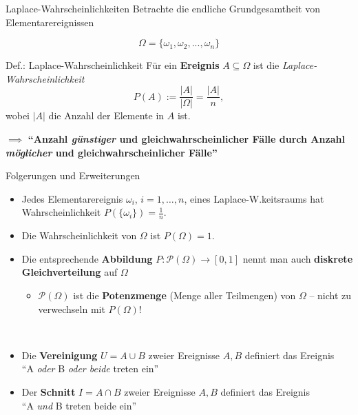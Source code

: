 \documentclass[
  10pt,
  ignorenonframetext,
]{beamer}
\providecommand{\tightlist}{%
  \setlength{\itemsep}{0pt}\setlength{\parskip}{0pt}}
\begin{document}
\begin{frame}{Laplace-Wahrscheinlichkeiten}
\label{laplace-wahrscheinlichkeiten-1}
Betrachte die endliche Grundgesamtheit von Elementarereignissen

\[\Omega = \{\omega_1, \omega_2, ..., \omega_n \}\]

\begin{block}{Def.: Laplace-Wahrscheinlichkeit}
\label{def.-laplace-wahrscheinlichkeit}
Für ein \textbf{Ereignis} \(A \subseteq \Omega\) ist die
\emph{Laplace-Wahrscheinlichkeit}
\[P(A) := \frac{|A|}{|\Omega|} = \frac{|A|}{n},\] wobei \(|A|\) die
Anzahl der Elemente in \(A\) ist.
\end{block}

\(\implies\) \textbf{``Anzahl \emph{günstiger} und
gleichwahrscheinlicher Fälle durch Anzahl \emph{möglicher} und
gleichwahrscheinlicher Fälle''}

\end{frame}

\begin{frame}{Folgerungen und Erweiterungen}
\label{folgerungen-und-erweiterungen}
\begin{itemize}
\item
  Jedes Elementarereignis \(\omega_i\), \(i = 1, \ldots, n\), eines
  Laplace-W.keitsraums hat Wahrscheinlichkeit
  \(P(\{\omega_i\})=\frac{1}{n}\).
\item
  Die Wahrscheinlichkeit von \(\Omega\) ist \(P(\Omega)=1\). ~
\item
  Die entsprechende \textbf{Abbildung}
  \(P:{\mathcal P}(\Omega) \to [0,1]\) nennt man auch \textbf{diskrete
  Gleichverteilung} auf \(\Omega\)

  \begin{itemize}
  \tightlist
  \item
    \({\mathcal P}(\Omega)\) ist die \textbf{Potenzmenge} (Menge aller
    Teilmengen) von \(\Omega\) -- nicht zu verwechseln mit
    \(P(\Omega)\)!\\
    \strut ~
  \end{itemize}
\item
  Die \textbf{Vereinigung} \(U = A \cup B\) zweier Ereignisse \(A, B\)
  definiert das Ereignis\\
  ``A \emph{oder} B \emph{oder beide} treten ein''
\item
  Der \textbf{Schnitt} \(I = A \cap B\) zweier Ereignisse \(A, B\)
  definiert das Ereignis\\
  ``A \emph{und} B treten beide ein''
\end{itemize}
\end{frame}
\end{document}
